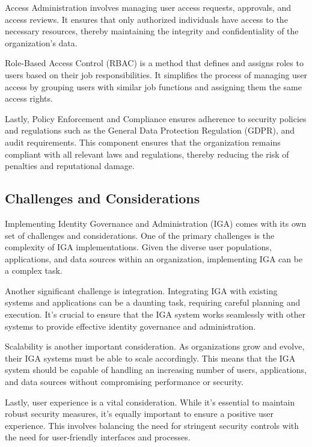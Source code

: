 Access Administration involves managing user access requests, approvals, and access reviews. It ensures that only authorized individuals have access to the necessary resources, thereby maintaining the integrity and confidentiality of the organization's data.

Role-Based Access Control (RBAC) is a method that defines and assigns roles to users based on their job responsibilities. It simplifies the process of managing user access by grouping users with similar job functions and assigning them the same access rights.

Lastly, Policy Enforcement and Compliance ensures adherence to security policies and regulations such as the General Data Protection Regulation (GDPR), and audit requirements. This component ensures that the organization remains compliant with all relevant laws and regulations, thereby reducing the risk of penalties and reputational damage.

\subsection{Challenges and Considerations}
\label{sec:Template}

Implementing Identity Governance and Administration (IGA) comes with its own set of challenges and considerations. One of the primary challenges is the complexity of IGA implementations. Given the diverse user populations, applications, and data sources within an organization, implementing IGA can be a complex task.

Another significant challenge is integration. Integrating IGA with existing systems and applications can be a daunting task, requiring careful planning and execution. It’s crucial to ensure that the IGA system works seamlessly with other systems to provide effective identity governance and administration.

Scalability is another important consideration. As organizations grow and evolve, their IGA systems must be able to scale accordingly. This means that the IGA system should be capable of handling an increasing number of users, applications, and data sources without compromising performance or security.

Lastly, user experience is a vital consideration. While it’s essential to maintain robust security measures, it’s equally important to ensure a positive user experience. This involves balancing the need for stringent security controls with the need for user-friendly interfaces and processes.

